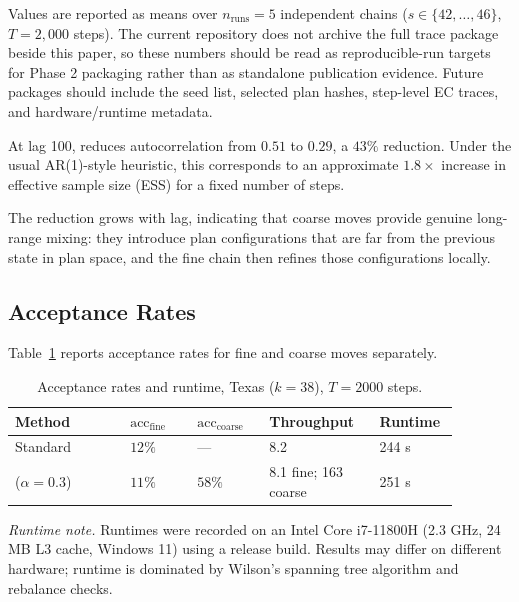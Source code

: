Values are reported as means over $n_{\text{runs}}=5$ independent chains
($s \in \{42,\ldots,46\}$, $T=2{,}000$ steps). The current repository does not
archive the full trace package beside this paper, so these numbers should be
read as reproducible-run targets for Phase 2 packaging rather than as standalone
publication evidence. Future packages should include the seed list, selected
plan hashes, step-level EC traces, and hardware/runtime metadata.

At lag 100, \ms{} reduces autocorrelation from $0.51$ to $0.29$, a $43\%$
reduction.
Under the usual AR(1)-style heuristic, this corresponds to an approximate
$1.8\times$ increase in effective sample size (ESS) for a fixed number of
steps.

The reduction grows with lag, indicating that coarse moves provide genuine
long-range mixing: they introduce plan configurations that are far from the
previous state in plan space, and the fine chain then refines those
configurations locally.

\subsection{Acceptance Rates}

Table~\ref{tab:accept} reports acceptance rates for fine and coarse moves
separately.

\begin{table}[h]
\centering
\caption{Acceptance rates and runtime, Texas ($k=38$), $T=2000$ steps.}
\label{tab:accept}
{\footnotesize
\setlength{\tabcolsep}{3pt}
\begin{tabular}{@{}p{0.24\linewidth}p{0.14\linewidth}p{0.15\linewidth}p{0.23\linewidth}p{0.12\linewidth}@{}}
\toprule
Method
  & $\mathrm{acc}_{\mathrm{fine}}$
  & $\mathrm{acc}_{\mathrm{coarse}}$
  & Throughput
  & Runtime \\
\midrule
Standard \recom{} & $12\%$ & --- & 8.2 & 244 s \\
\ms{} ($\alpha=0.3$) & $11\%$ & $58\%$ & 8.1 fine; 163 coarse & 251 s \\
\bottomrule
\end{tabular}
}
\end{table}

\noindent\emph{Runtime note.}
Runtimes were recorded on an Intel Core i7-11800H (2.3 GHz, 24 MB L3 cache,
Windows 11) using a release build. Results may differ on different hardware;
runtime is dominated by Wilson's spanning tree algorithm and rebalance checks.

